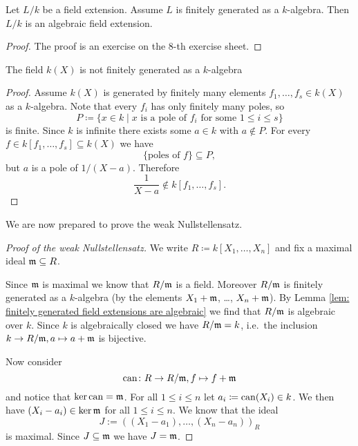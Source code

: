 \begin{lem}\label{lem: finitely generated field extensions are algebraic}
 Let $L/k$ be a field extension. Assume $L$ is finitely generated as a $k$-algebra. Then $L/k$ is an algebraic field extension.
\end{lem}
\begin{proof}
 The proof is an exercise on the $8$-th exercise sheet.
\end{proof}


\begin{rem}
 The field $k(X)$ is not finitely generated as a $k$-algebra
 \begin{proof}
  Assume $k(X)$ is generated by finitely many elements $f_1, \dotsc, f_s \in k(X)$ as a $k$-algebra. Note that every $f_i$ has only finitely many poles, so
  \[
   P \coloneqq \{x \in k \mid \text{$x$ is a pole of $f_i$ for some $1 \leq i \leq s$}\}
  \]
  is finite. Since $k$ is infinite there exists some $a \in k$ with $a \not\in P$. For every $f \in k[f_1, \dotsc, f_s] \subseteq k(X)$ we have
  \[
   \{\text{poles of $f$}\} \subseteq P,
  \]
   but $a$ is a pole of $1/(X-a)$. Therefore
  \[
   \frac{1}{X-a} \not\in k[f_1, \dotsc, f_s].
  \]
 \end{proof}
\end{rem}


We are now prepared to prove the weak Nullstellensatz.


\begin{proof}[Proof of the weak Nullstellensatz]
 We write $R \coloneqq k[X_1, \dotsc, X_n]$ and fix a maximal ideal $\mathfrak{m} \subseteq R$.
 
 Since $\mathfrak{m}$ is maximal we know that $R/\mathfrak{m}$ is a field. Moreover $R/\mathfrak{m}$ is finitely generated as a $k$-algebra (by the elements $X_1 + \mathfrak{m}$, \dots, $X_n + \mathfrak{m}$). By Lemma \ref{lem: finitely generated field extensions are algebraic} we find that $R/\mathfrak{m}$ is algebraic over $k$. Since $k$ is algebraically closed we have 
 $R/\mathfrak{m} = k$, i.e.\ the inclusion $k \to R/\mathfrak{m}, a \mapsto a+\mathfrak{m}$ is bijective.
 
 Now consider
 \[
  \operatorname{can} \colon R \to R/\mathfrak{m}, f \mapsto f + \mathfrak{m}
 \]
 and notice that $\ker \operatorname{can} = \mathfrak{m}$. For all $1 \leq i \leq n$ let $a_i \coloneqq \operatorname{can}(X_i) \in k$. We then have $(X_i - a_i) \in \ker \mathfrak{m}$ for all $1 \leq i \leq n$. We know that the ideal
 \[
  J := ((X_1 - a_1), \dotsc, (X_n - a_n))_R
 \]
 is maximal. Since $J \subseteq \mathfrak{m}$ we have $J = \mathfrak{m}$.
\end{proof}


